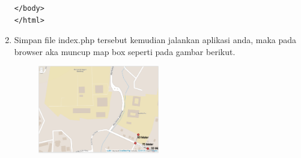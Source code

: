 \begin{enumerate}
\begin{lstlisting}[caption=Pemanggilan Library setView pada index.php]
</body>
</html>
\end{lstlisting}

    \item Simpan file index.php tersebut kemudian jalankan aplikasi anda, maka pada browser aka muncup map box seperti pada gambar berikut.
	\begin{figure}[!htbp]
		\centering
		\includegraphics[width=0.5\textwidth]{figures/LEAFLETJS/LJS3.png}
		\label{Leaflet3}
	\end{figure}

\end{enumerate}




